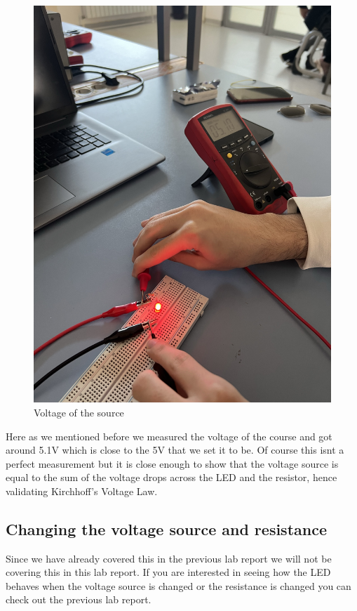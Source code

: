 \documentclass[a4paper, 10pt]{article}
\begin{document}
			\pagebreak
			\begin{figure}[h!]
				\centering
				\includegraphics[height = 0.35\textheight]{images/Circ1_VDrop_Circ.jpeg}
				\caption{Voltage of the source}
				\label{fig:VoltageSourceCirc1}
			\end{figure}

			Here as we mentioned before we measured the voltage of the course and got around 5.1V which is close to the 5V that we set it to be.
			Of course this isnt a perfect measurement but it is close enough to show that the voltage source is equal to the sum of the voltage drops across the LED and the resistor,
			hence validating Kirchhoff's Voltage Law.

		\subsection{Changing the voltage source and resistance}
			Since we have already covered this in the previous lab report we will not be covering this in this lab report.
			If you are interested in seeing how the LED behaves when the voltage source is changed or the resistance is changed you can check out the previous lab report.
	
\end{document}
